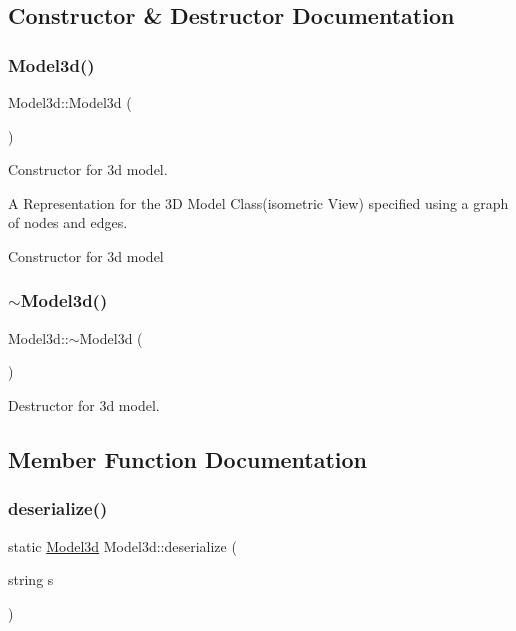\subsection{Constructor \& Destructor Documentation}
\mbox{\label{class_model3d_a134d35fcc3e1097f4e8471a98a5f566b}} 
\subsubsection{\texorpdfstring{Model3d()}{Model3d()}}
{\footnotesize\ttfamily Model3d\+::\+Model3d (\begin{DoxyParamCaption}{ }\end{DoxyParamCaption})}



Constructor for 3d model. 

A Representation for the 3D Model Class(isometric View) specified using a graph of nodes and edges.

Constructor for 3d model \mbox{\label{class_model3d_a7a4ec3be34c901538574d99d95a46b04}} 
\subsubsection{\texorpdfstring{$\sim$\+Model3d()}{~Model3d()}}
{\footnotesize\ttfamily Model3d\+::$\sim$\+Model3d (\begin{DoxyParamCaption}{ }\end{DoxyParamCaption})}



Destructor for 3d model. 



\subsection{Member Function Documentation}
\mbox{\label{class_model3d_af45a652605d93085f253b044bfd34e1a}} 
\subsubsection{\texorpdfstring{deserialize()}{deserialize()}}
{\footnotesize\ttfamily static \mbox{\hyperlink{class_model3d}{Model3d}} Model3d\+::deserialize (\begin{DoxyParamCaption}\item[{string}]{s }\end{DoxyParamCaption})\hspace{0.3cm}{\ttfamily [static]}}



